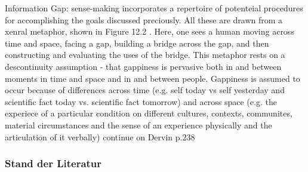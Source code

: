 Information Gap:
\cite{dervin2003sense}
sense-making incorporates a repertoire of potenteial procedures for accomplishing the goals discussed preciously. All these are drawn from a xenral metaphor, shown in Figure 12.2 \includegraphics[width=00.5]{SMM_MEtaphor.jpg}. Here, one sees a human moving across time and space, facing a gap, building a bridge across the gap, and then constructing and evaluating the uses of the bridge. This metaphor rests on a descontinuity assumption - that gappiness is pervasive both in and between moments in time and space and in and between people. Gappiness is assumed to occur because of differences across time (e.g. self today vs self yesterday and scientific fact today vs. scientific fact tomorrow) and across space (e.g. the experiece of a particular condition on different cultures, contexts, communites, material circumstances and the sense of an experience physically and the articulation of it verbally)
continue on Dervin p.238


\subsubsection{Stand der Literatur}

